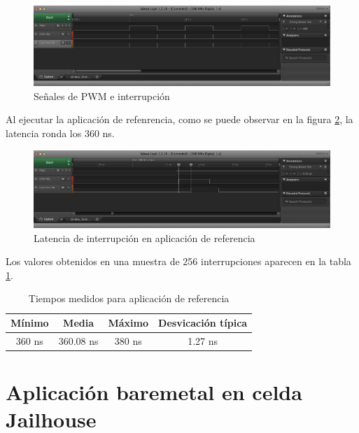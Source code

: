 \begin{figure}[h]
  \centering
  \includegraphics[width=1.0\textwidth]{recursos/baremetal_1.png}
  \caption{Señales de PWM e interrupción}
  \label{fig:resultados:baremetal_1}
\end{figure}

Al ejecutar la aplicación de refenrencia, como se puede observar en la figura \ref{fig:resultados:baremetal_2}, la latencia ronda los 360 ns.\\

\begin{figure}[!h]
  \centering
  \includegraphics[width=1.0\textwidth]{recursos/baremetal_2.png}
  \caption{Latencia de interrupción en aplicación de referencia}
  \label{fig:resultados:baremetal_2}
\end{figure}

Los valores obtenidos en una muestra de 256 interrupciones aparecen en la tabla \ref{table:results_baremetal}. \\
\begin{table}[!ht]
  \centering
	\begin{tabular}{ |c|c|c|c| }
		\hline
    Mínimo          & Media      & Máximo  & Desvicación típica  \\
    \hline
    360 ns         & 360.08 ns      & 380 ns    & 1.27 ns	   \\
    \hline
	\end{tabular}
	\caption{Tiempos medidos para aplicación de referencia}
  \label{table:results_baremetal}
\end{table}

\section{Aplicación baremetal en celda Jailhouse}


